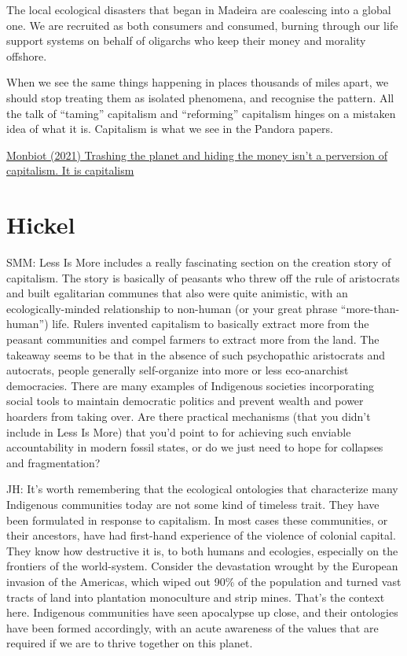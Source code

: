 \documentclass[
]{book}
\begin{document}
The local ecological disasters that began in Madeira are coalescing into a global one. We are recruited as both consumers and consumed, burning through our life support systems on behalf of oligarchs who keep their money and morality offshore.

When we see the same things happening in places thousands of miles apart, we should stop treating them as isolated phenomena, and recognise the pattern. All the talk of ``taming'' capitalism and ``reforming'' capitalism hinges on a mistaken idea of what it is. Capitalism is what we see in the Pandora papers.

\href{https://www.theguardian.com/commentisfree/2021/oct/06/offshoring-wealth-capitalism-pandora-papers}{Monbiot (2021) Trashing the planet and hiding the money isn't a perversion of capitalism. It is capitalism}

\hypertarget{hickel}{%
\section{Hickel}\label{hickel}}

SMM: Less Is More includes a really fascinating section on the creation story of capitalism. The story is basically of peasants who threw off the rule of aristocrats and built egalitarian communes that also were quite animistic, with an ecologically-minded relationship to non-human (or your great phrase ``more-than-human'') life. Rulers invented capitalism to basically extract more from the peasant communities and compel farmers to extract more from the land. The takeaway seems to be that in the absence of such psychopathic aristocrats and autocrats, people generally self-organize into more or less eco-anarchist democracies. There are many examples of Indigenous societies incorporating social tools to maintain democratic politics and prevent wealth and power hoarders from taking over. Are there practical mechanisms (that you didn't include in Less Is More) that you'd point to for achieving such enviable accountability in modern fossil states, or do we just need to hope for collapses and fragmentation?

JH: It's worth remembering that the ecological ontologies that characterize many Indigenous communities today are not some kind of timeless trait. They have been formulated in response to capitalism. In most cases these communities, or their ancestors, have had first-hand experience of the violence of colonial capital. They know how destructive it is, to both humans and ecologies, especially on the frontiers of the world-system. Consider the devastation wrought by the European invasion of the Americas, which wiped out 90\% of the population and turned vast tracts of land into plantation monoculture and strip mines. That's the context here. Indigenous communities have seen apocalypse up close, and their ontologies have been formed accordingly, with an acute awareness of the values that are required if we are to thrive together on this planet.
\end{document}
